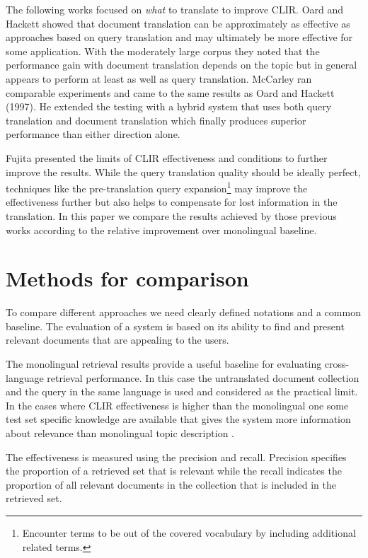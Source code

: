 \documentclass[journal]{IEEEtran}
\begin{document}
The following works focused on \textit{what} to translate to improve CLIR.
Oard and Hackett \cite{oard97b} showed that document translation can be approximately as effective as approaches based on query translation and may ultimately be more effective for some application.
With the moderately large corpus they noted that the performance gain with document translation depends on the topic but in general appears to perform at least as well as query translation.
McCarley \cite{mccarley99} ran comparable experiments and came to the same results as Oard and Hackett (1997).
He extended the testing with a hybrid system that uses both query translation and document translation which finally produces superior performance than either direction alone.

Fujita \cite{fujita01} presented the limits of CLIR effectiveness and conditions to further improve the results.
While the query translation quality should be ideally perfect, techniques like the pre-translation query expansion\footnote{Encounter terms to be out of the covered vocabulary by including additional related terms.} may improve the effectiveness further but also helps to compensate for lost information in the translation.
In this paper we compare the results achieved by those previous works according to the relative improvement over monolingual baseline.



\section{Methods for comparison}
To compare different approaches we need clearly defined notations and a common baseline.
The evaluation of a system is based on its ability to find and present relevant documents that are appealing to the users.

The monolingual retrieval results provide a useful baseline for evaluating cross-language retrieval performance.
In this case the untranslated document collection and the query in the same language is used and considered as the practical limit.
In the cases where CLIR effectiveness is higher than the monolingual one some test set specific knowledge are available that gives the system more information about relevance than monolingual topic description \cite{xu00}.

The effectiveness is measured using the precision and recall.
Precision specifies the proportion of a retrieved set that is relevant while the recall indicates the proportion of all relevant documents in the collection that is included in the retrieved set.
\end{document}
